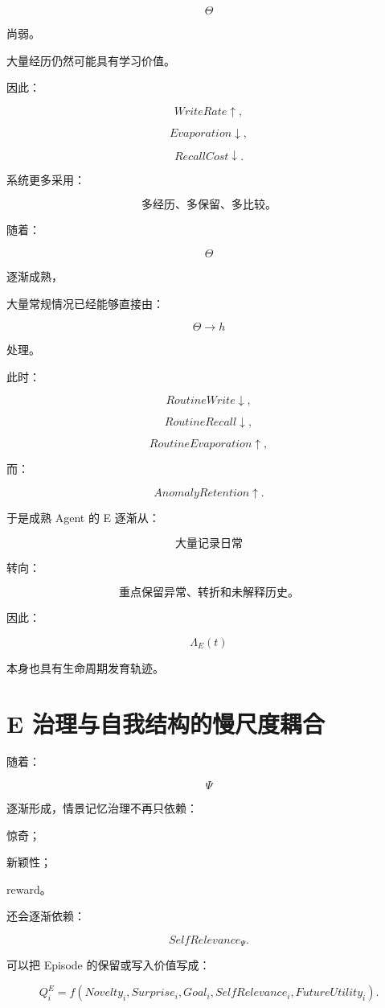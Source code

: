 \[
\Theta
\]

尚弱。

大量经历仍然可能具有学习价值。

因此：

\[
WriteRate\uparrow,
\]

\[
Evaporation\downarrow,
\]

\[
RecallCost\downarrow.
\]

系统更多采用：

\[
\boxed{
\text{多经历、多保留、多比较。}
}
\]

随着：

\[
\Theta
\]

逐渐成熟，

大量常规情况已经能够直接由：

\[
\Theta\rightarrow h
\]

处理。

此时：

\[
RoutineWrite\downarrow,
\]

\[
RoutineRecall\downarrow,
\]

\[
RoutineEvaporation\uparrow,
\]

而：

\[
AnomalyRetention\uparrow.
\]

于是成熟 Agent 的 E 逐渐从：

\[
\boxed{
\text{大量记录日常}
}
\]

转向：

\[
\boxed{
\text{重点保留异常、转折和未解释历史。}
}
\]

因此：

\[
\boxed{
\Lambda_E(t)
}
\]

本身也具有生命周期发育轨迹。


\section{E 治理与自我结构的慢尺度耦合}

随着：

\[
\Psi
\]

逐渐形成，情景记忆治理不再只依赖：

惊奇；

新颖性；

reward。

还会逐渐依赖：

\[
\boxed{
SelfRelevance_{\Psi}.
}
\]

可以把 Episode 的保留或写入价值写成：

\[
Q_i^E
=
f(
Novelty_i,
Surprise_i,
Goal_i,
SelfRelevance_i,
FutureUtility_i
).
\]


